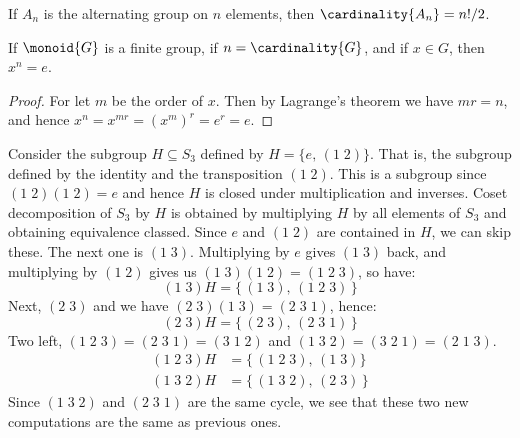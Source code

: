             \begin{theorem}
                If $A_{n}$ is the alternating group on $n$ elements, then
                $\cardinality{A_{n}}=n!/2$.
            \end{theorem}
            \begin{theorem}
                If $\monoid{G}$ is a finite group, if $n=\cardinality{G}$,
                and if $x\in{G}$, then $x^{n}=e$.
            \end{theorem}
            \begin{proof}
                For let $m$ be the order of $x$. Then by Lagrange's theorem
                we have $mr=n$, and hence
                $x^{n}=x^{mr}=(x^{m})^{r}=e^{r}=e$.
            \end{proof}
            \begin{example}
                Consider the subgroup $H\subseteq{S}_{3}$ defined by
                $H=\{e,\,(1\;2)\}$. That is, the subgroup defined by the
                identity and the transposition $(1\;2)$. This is a subgroup
                since $(1\;2)(1\;2)=e$ and hence $H$ is closed under
                multiplication and inverses. Coset decomposition of $S_{3}$
                by $H$ is obtained by multiplying $H$ by all elements of
                $S_{3}$ and obtaining equivalence classed. Since
                $e$ and $(1\;2)$ are contained in $H$, we can skip these.
                The next one is $(1\;3)$. Multiplying by $e$ gives $(1\;3)$
                back, and multiplying by $(1\;2)$ gives us
                $(1\;3)(1\;2)=(1\;2\;3)$, so have:
                \begin{equation}
                    (1\;3)H=\{\,(1\;3),\,(1\;2\;3)\,\}
                \end{equation}
                Next, $(2\;3)$ and we have $(2\;3)(1\;3)=(2\;3\;1)$, hence:
                \begin{equation}
                    (2\;3)H=\{\,(2\;3),\,(2\;3\;1)\,\}
                \end{equation}
                Two left, $(1\;2\;3)=(2\;3\;1)=(3\;1\;2)$ and
                $(1\;3\;2)=(3\;2\;1)=(2\;1\;3)$.
                \begin{subequations}
                    \begin{align}
                        (1\;2\;3)H&=\{\,(1\;2\;3),\,(1\;3)\}\\
                        (1\;3\;2)H&=\{\,(1\;3\;2),\,(2\;3)\,\}
                    \end{align}
                \end{subequations}
                Since $(1\;3\;2)$ and $(2\;3\;1)$ are the same cycle, we see
                that these two new computations are the same as previous
                ones.
            \end{example}
